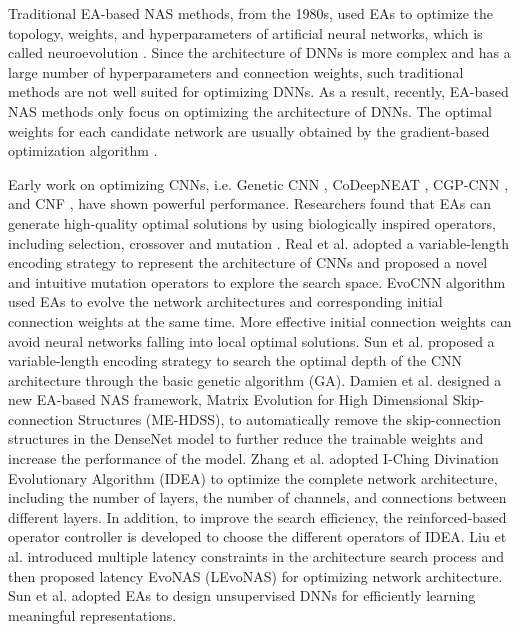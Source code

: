 \documentclass[journal]{IEEEtran}
\begin{document}
Traditional EA-based NAS methods, from the 1980s, used EAs to optimize the topology, weights, and hyperparameters of artificial neural networks, which is called neuroevolution \cite{schaffer1992combinations, yao1999evolving, stanley2002evolving, inden2012evolving}. Since the architecture of DNNs is more complex and has a large number of hyperparameters and connection weights, such traditional methods are not well suited for optimizing DNNs. As a result, recently, EA-based NAS methods only focus on optimizing the architecture of DNNs. The optimal weights for each candidate network are usually obtained by the gradient-based optimization algorithm \cite{bengio2012practical}.

Early work on optimizing CNNs, i.e. Genetic CNN \cite{xie2017genetic}, CoDeepNEAT \cite{miikkulainen2019evolving, liang2018evolutionary}, CGP-CNN \cite{suganuma2017genetic}, and CNF \cite{saxena2016convolutional}, have shown powerful performance. Researchers found that EAs can generate high-quality optimal solutions by using biologically inspired operators, including selection, crossover and mutation \cite{mitchell1998introduction}. Real et al. \cite{real2017large} adopted a variable-length encoding strategy to represent the architecture of CNNs and proposed a novel and intuitive mutation operators to explore the search space. EvoCNN algorithm \cite{sun2019evolving} used EAs to evolve the network architectures and corresponding initial connection weights at the same time. More effective initial connection weights can avoid neural networks falling into local optimal solutions. Sun et al. \cite{9075201, 8742788} proposed a variable-length encoding strategy to search the optimal depth of the CNN architecture through the basic genetic algorithm (GA). Damien et al. \cite{9439793} designed a new EA-based NAS framework, Matrix Evolution for High Dimensional Skip-connection Structures (ME-HDSS), to automatically remove the skip-connection structures in the DenseNet \cite{huang2017densely} model to further reduce the trainable weights and increase the performance of the model. Zhang et al. \cite{zhang2021adaptive} adopted I-Ching Divination Evolutionary Algorithm (IDEA) to optimize the complete network architecture, including the number of layers, the number of channels, and connections between different layers. In addition, to improve the search efficiency, the reinforced-based operator controller is developed to choose the different operators of IDEA. Liu et al. \cite{liu2020block} introduced multiple latency constraints in the architecture search process and then proposed latency EvoNAS (LEvoNAS) for optimizing network architecture. Sun et al. \cite{sun2018evolving} adopted EAs to design unsupervised DNNs for efficiently learning meaningful representations.
\end{document}

